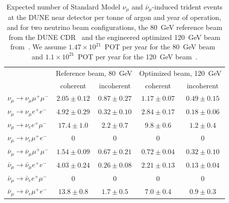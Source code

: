 \begin{table}[!b]
\begin{center}
\begin{tabular}{lcccc}
\toprule
& \multicolumn{2}{c}{Reference beam, 80~GeV} & \multicolumn{2}{c}{Optimized beam, 120~GeV} \\
& coherent & incoherent & coherent & incoherent \\
\midrule
$\nu_\mu \to \nu_\mu \mu^+\mu^-$ & $2.05 \pm 0.12$ & $0.87 \pm 0.27$ & $1.17 \pm 0.07$ & $0.49 \pm 0.15$ \\
$\nu_\mu \to \nu_\mu e^+e^-$ & $4.92 \pm 0.29$ & $0.32 \pm 0.10$ & $2.84 \pm 0.17$ & $0.18 \pm 0.06$\\
$\nu_\mu \to \nu_e e^+\mu^-$ & $17.4 \pm 1.0$ & $2.2 \pm 0.7$ & $9.8 \pm 0.6$ & $1.2 \pm 0.4$ \\
$\nu_\mu \to \nu_e \mu^+e^-$ & $0$ & $0$ & $0$ & $0$ \\
\midrule
$\bar\nu_\mu \to \bar\nu_\mu \mu^+\mu^-$ & $1.54 \pm 0.09$ & $0.67 \pm 0.21$ & $0.72 \pm 0.04$ & $0.32 \pm 0.10$ \\
$\bar\nu_\mu \to \bar\nu_\mu e^+e^-$ & $4.03 \pm 0.24$ & $0.26 \pm 0.08$ & $2.21 \pm 0.13$ & $0.13 \pm 0.04$ \\
$\bar\nu_\mu \to \bar\nu_e e^+\mu^-$ & $0$ & $0$ & $0$ & $0$ \\
$\bar\nu_\mu \to \bar\nu_e \mu^+e^-$ & $13.8 \pm 0.8$ & $1.7 \pm 0.5$ & $7.0 \pm 0.4$ & $0.9 \pm 0.3$ \\
\bottomrule
\end{tabular}
\end{center}
\caption{Expected number of Standard Model $\nu_\mu$ and $\bar\nu_\mu$-induced trident events at the DUNE near detector per tonne of argon and year of operation, and for two neutrino beam configurations, the 80~GeV reference beam from the DUNE CDR~\cite{cdr-vol-2} and the engineered optimized 120~GeV beam from~\cite{fields_doc_2901}. We assume $1.47 \times 10^{21}$~POT per year for the 80~GeV beam~\cite{cdr-vol-2} and  $1.1 \times 10^{21}$~POT per year for the 120~GeV beam~\cite{fields_doc_2901}.}
\label{tab:trident_rates}
\end{table}

